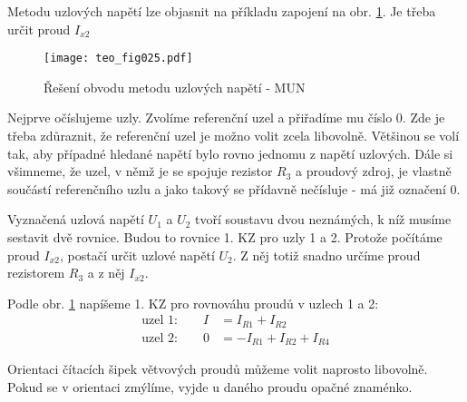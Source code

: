       Metodu uzlových napětí lze objasnit na příkladu zapojení na obr. \ref{teo:fig025}. Je
      třeba určit proud $I_{x2}$ 
      \begin{figure}[ht!]  %
        \centering
        \texttt{[image: teo\_fig025.pdf]}
        \caption{Řešení obvodu metodu uzlových napětí - MUN \cite[s.~62]{Biolek}}
        \label{teo:fig025}
      \end{figure}
      Nejprve očíslujeme uzly. Zvolíme referenční uzel a přiřadíme mu číslo 0. Zde je třeba  
      zdůraznit, že referenční uzel je možno volit zcela libovolně. Většinou se volí tak, aby 
      případné hledané napětí bylo rovno jednomu z napětí uzlových. Dále si všimneme, že uzel, v 
      němž je se spojuje rezistor $R_3$ a proudový zdroj, je vlastně součástí referenčního uzlu a 
      jako takový se přídavně nečísluje - má již označení \num{0}.
      
      Vyznačená uzlová napětí $U_1$ a $U_2$ tvoří soustavu dvou neznámých, k níž musíme sestavit 
      dvě rovnice. Budou to rovnice 1. KZ pro uzly 1 a 2. Protože počítáme proud $I_{x2}$, postačí 
      určit uzlové napětí $U_2$. Z něj totiž snadno určíme proud rezistorem $R_3$ a z něj $I_{x2}$.
      
      Podle obr. \ref{teo:fig025} napíšeme 1. KZ pro rovnováhu proudů v uzlech 1 a 2:
      \begin{align*}
        \text{uzel 1:} \qquad I &=  I_{R1} + I_{R2}            \\
        \text{uzel 2:} \qquad 0 &= -I_{R1} + I_{R2} + I_{R4}  
      \end{align*}
      
      Orientaci čítacích šipek větvových proudů můžeme volit naprosto libovolně. Pokud se v 
      orientaci zmýlíme, vyjde u daného proudu opačné znaménko.
      
